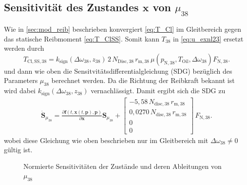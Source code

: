 \subsection{Sensitivität des Zustandes $\pmb{x}$ von $\mu_{38}$}
Wie in \ref{sec:mod_reib} beschrieben konvergiert \eqref{eq:T_Cl} im Gleitbereich gegen das statische Reibmoment \eqref{eq:T_ClSS}. Somit kann $T_{38}$ in \eqref{eq:u_exnl23} ersetzt werden durch
\begin{equation}
T_\mathrm{Cl,SS,38} = k_\mathrm{sign}(\Delta \omega_{38},z_{38})\,2\,N_{\mathrm{Disc,38}}\,r_{\mathrm{m},38}\,\mu(p_\mathrm{N,38},T_\mathrm{Oil},\Delta \omega_{38})F_\mathrm{N,38}.
\end{equation}
und dann wie oben die Sensitvitätsdifferentialgleichung (SDG) bezüglich des Parameters $\mu_{38}$ berechnet werden. Da die Richtung der Reibkraft bekannt ist wird dabei $k_\mathrm{sign}(\Delta \omega_{38},z_{38})$ vernachlässigt. Damit ergibt sich die SDG zu
\begin{align}
\dot{\pmb{S}}_{\mu_{38}} = \frac{\partial\pmb{f}(t,\pmb{x}(t,\pmb{p}),\pmb{p})}{\partial \pmb{x}} \pmb{S}_{\mu_{38}}
+ \begin{bmatrix} -5,58\,N_\mathrm{disc,38}\,r_{\mathrm{m},38} \\ 0,0270\,N_\mathrm{disc,38}\,r_{\mathrm{m},38} \\ 0 \\ 0 \end{bmatrix}\,F_\mathrm{N,38}.
\end{align}
wobei diese Gleichung wie oben beschrieben nur im Gleitbereich mit $\Delta \omega_{38}\neq 0$ gültig ist.

\begin{figure}
\centering
\newlength\muheight 
\setlength\muheight{8cm}
\newlength\muwidth 
\setlength\muwidth{13cm}

\caption{Normierte Sensitivitäten der Zustände und deren Ableitungen von $\mu_{38}$}
\label{fig:Sens_mu}
\end{figure}

